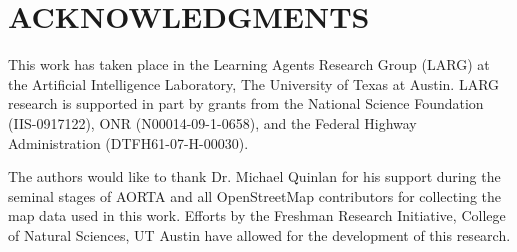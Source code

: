 \documentclass[letterpaper, 10 pt, conference]{ieeeconf}  %
\begin{document}
\section*{ACKNOWLEDGMENTS}

This work has taken place in the Learning Agents Research Group (LARG) at the
Artificial Intelligence Laboratory, The University of Texas at Austin. LARG
research is supported in part by grants from the National Science Foundation
(IIS-0917122), ONR (N00014-09-1-0658), and the Federal Highway Administration
(DTFH61-07-H-00030). 

The authors would like to thank Dr. Michael Quinlan for his support during the
seminal stages of AORTA and all OpenStreetMap contributors for collecting the
map data used in this work. Efforts by the Freshman Research Initiative,
College of Natural Sciences, UT Austin have allowed for the development of this
research.




\end{document}
